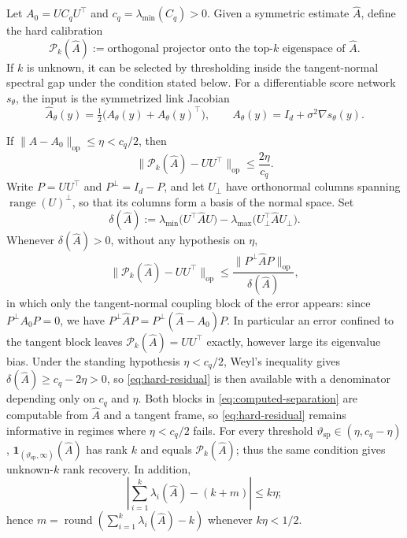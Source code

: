 \documentclass[10pt]{article}
\theoremstyle{c2fup}
\newcommand{\op}{\mathrm{op}}
\newcommand{\range}{\operatorname{range}}
\begin{document}
Let $A_0=UC_qU^\top$ and $c_q=\lambda_{\min}(C_q)>0$.  Given a symmetric estimate $\widehat A$, define the hard calibration
\begin{equation}
  \mathcal{P}_k(\widehat A)
  :=\text{orthogonal projector onto the top-$k$ eigenspace of }\widehat A.
  \label{eq:hard}
\end{equation}
If $k$ is unknown, it can be selected by thresholding inside the tangent-normal spectral gap under the condition stated below.  For a differentiable score network $s_\theta$, the input is the symmetrized link Jacobian
\begin{equation}
  \widehat A_\theta(y)=\tfrac12\bigl(A_\theta(y)+A_\theta(y)^\top\bigr),
  \qquad A_\theta(y)=I_d+\sigma^2\nabla s_\theta(y).
\end{equation}

\begin{proposition}
\label{prop:hard}
If $\|\widehat A-A_0\|_\op\le\eta<c_q/2$, then
\begin{equation}
  \|\mathcal{P}_k(\widehat A)-UU^\top\|_\op
  \le \frac{2\eta}{c_q}.
  \label{eq:hard-bound}
\end{equation}
Write $P=UU^\top$ and $P^\perp=I_d-P$, and let $U_\perp$ have orthonormal columns
spanning $\range(U)^\perp$, so that its columns form a basis of the normal
space.  Set
\begin{equation}
  \delta(\widehat A)
  :=\lambda_{\min}\bigl(U^\top\widehat AU\bigr)
   -\lambda_{\max}\bigl(U_\perp^\top\widehat AU_\perp\bigr).
  \label{eq:computed-separation}
\end{equation}
Whenever $\delta(\widehat A)>0$, without any hypothesis on $\eta$,
\begin{equation}
  \|\mathcal{P}_k(\widehat A)-UU^\top\|_\op
  \le\frac{\|P^\perp\widehat AP\|_\op}{\delta(\widehat A)},
  \label{eq:hard-residual}
\end{equation}
in which only the tangent-normal coupling block of the error appears: since
$P^\perp A_0P=0$, we have $P^\perp\widehat AP=P^\perp(\widehat A-A_0)P$.  In
particular an error confined to the tangent block leaves
$\mathcal P_k(\widehat A)=UU^\top$ exactly, however large its eigenvalue bias.
Under the standing hypothesis $\eta<c_q/2$, Weyl's inequality gives
$\delta(\widehat A)\ge c_q-2\eta>0$, so \eqref{eq:hard-residual} is then
available with a denominator depending only on $c_q$ and $\eta$.  Both blocks in
\eqref{eq:computed-separation} are computable from $\widehat A$ and a tangent
frame, so \eqref{eq:hard-residual} remains informative in regimes where
$\eta<c_q/2$ fails.
For every threshold $\vartheta_{\mathrm{sp}}\in(\eta,c_q-\eta)$,
$\mathbf 1_{(\vartheta_{\mathrm{sp}},\infty)}(\widehat A)$ has rank $k$ and equals
$\mathcal P_k(\widehat A)$; thus the same condition gives unknown-$k$ rank recovery.
In addition,
\begin{equation}
  \left|\sum_{i=1}^k\lambda_i(\widehat A)-(k+m)\right|\le k\eta;
\end{equation}
hence $m=\operatorname{round}(\sum_{i=1}^k\lambda_i(\widehat A)-k)$ whenever $k\eta<1/2$.
\end{proposition}
\end{document}
